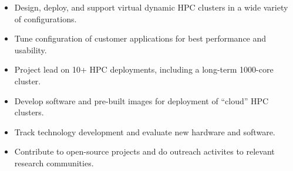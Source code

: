 \documentclass[12pt]{article}
\begin{document}
\begin{itemize}\setlength{\itemsep}{0cm}
  \setlength{\parskip}{0cm}

\item Design, deploy, and support virtual dynamic HPC clusters in a wide variety of configurations.
\item Tune configuration of customer applications for best performance and usability.
\item Project lead on 10+ HPC deployments, including a long-term 1000-core cluster.
\item Develop software and pre-built images for deployment of ``cloud'' HPC clusters.
\item Track technology development and evaluate new hardware and software.
\item Contribute to open-source projects and do outreach activites to relevant research communities.

\end{itemize}
\end{document}
